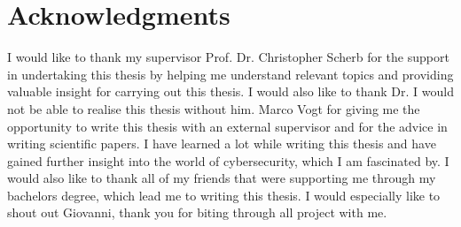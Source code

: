 \chapter{Acknowledgments}

I would like to thank my supervisor Prof. Dr. Christopher Scherb for the support in undertaking this thesis by helping me understand relevant topics and providing valuable insight for carrying out this thesis. I would also like to thank Dr. I would not be able to realise this thesis without him. Marco Vogt for giving me the opportunity to write this thesis with an external supervisor and for the advice in writing scientific papers. I have learned a lot while writing this thesis and have gained further insight into the world of cybersecurity, which I am fascinated by. I would also like to thank all of my friends that were supporting me through my bachelors degree, which lead me to writing this thesis. I would especially like to shout out Giovanni, thank you for biting through all project with me.
